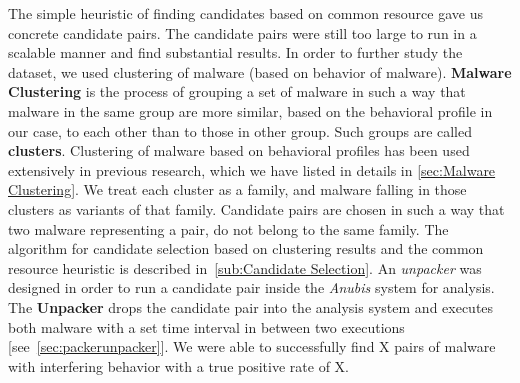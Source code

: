 The simple heuristic of finding candidates based on common resource gave us concrete candidate pairs.
The candidate pairs were still too large to run in a scalable manner and find substantial results.
In order to further study the dataset, we used clustering of malware (based on behavior of malware).
\textbf{Malware Clustering} is the process of grouping a set of malware in such a way that malware in the same group are more similar, based on the behavioral profile in our case, to each other than to those in other group.
Such groups are called \textbf{clusters}.
Clustering of malware based on behavioral profiles has been used extensively in previous research, which we have listed in details in \autoref{sec:Malware Clustering}.
We treat each cluster as a family, and malware falling in those clusters as variants of that family.
Candidate pairs are chosen in such a way that two malware representing a pair, do not belong to the same family.
The algorithm for candidate selection based on clustering results and the common resource heuristic is described in~\autoref{sub:Candidate Selection}.
An \emph{unpacker} was designed in order to run a candidate pair inside the \emph{Anubis} system for analysis.
The \textbf{Unpacker} drops the candidate pair into the analysis system and executes both malware with a set time interval in between two executions [see~\autoref{sec:packerunpacker}].
We were able to successfully find X pairs of malware with interfering behavior with a true positive rate of X.\\

